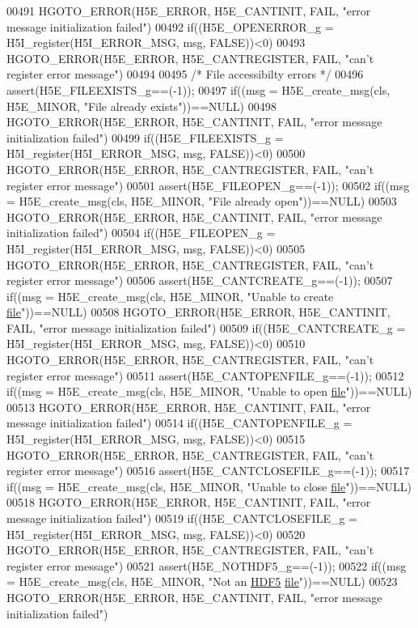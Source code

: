 \begin{DoxyCode}
00491     HGOTO\_ERROR(H5E\_ERROR, H5E\_CANTINIT, FAIL, "error message initialization failed")
00492 if((H5E\_OPENERROR\_g = H5I\_register(H5I\_ERROR\_MSG, msg, FALSE))<0)
00493     HGOTO\_ERROR(H5E\_ERROR, H5E\_CANTREGISTER, FAIL, "can't register error message")
00494 
00495 \textcolor{comment}{/* File accessibilty errors */}
00496 assert(H5E\_FILEEXISTS\_g==(-1));
00497 if((msg = H5E\_create\_msg(cls, H5E\_MINOR, "File already exists"))==NULL)
00498     HGOTO\_ERROR(H5E\_ERROR, H5E\_CANTINIT, FAIL, "error message initialization failed")
00499 if((H5E\_FILEEXISTS\_g = H5I\_register(H5I\_ERROR\_MSG, msg, FALSE))<0)
00500     HGOTO\_ERROR(H5E\_ERROR, H5E\_CANTREGISTER, FAIL, "can't register error message")
00501 assert(H5E\_FILEOPEN\_g==(-1));
00502 if((msg = H5E\_create\_msg(cls, H5E\_MINOR, "File already open"))==NULL)
00503     HGOTO\_ERROR(H5E\_ERROR, H5E\_CANTINIT, FAIL, "error message initialization failed")
00504 if((H5E\_FILEOPEN\_g = H5I\_register(H5I\_ERROR\_MSG, msg, FALSE))<0)
00505     HGOTO\_ERROR(H5E\_ERROR, H5E\_CANTREGISTER, FAIL, "can't register error message")
00506 assert(H5E\_CANTCREATE\_g==(-1));
00507 if((msg = H5E\_create\_msg(cls, H5E\_MINOR, "Unable to create \hyperlink{structfile}{file}"))==NULL)
00508     HGOTO\_ERROR(H5E\_ERROR, H5E\_CANTINIT, FAIL, "error message initialization failed")
00509 if((H5E\_CANTCREATE\_g = H5I\_register(H5I\_ERROR\_MSG, msg, FALSE))<0)
00510     HGOTO\_ERROR(H5E\_ERROR, H5E\_CANTREGISTER, FAIL, "can't register error message")
00511 assert(H5E\_CANTOPENFILE\_g==(-1));
00512 if((msg = H5E\_create\_msg(cls, H5E\_MINOR, "Unable to open \hyperlink{structfile}{file}"))==NULL)
00513     HGOTO\_ERROR(H5E\_ERROR, H5E\_CANTINIT, FAIL, "error message initialization failed")
00514 if((H5E\_CANTOPENFILE\_g = H5I\_register(H5I\_ERROR\_MSG, msg, FALSE))<0)
00515     HGOTO\_ERROR(H5E\_ERROR, H5E\_CANTREGISTER, FAIL, "can't register error message")
00516 assert(H5E\_CANTCLOSEFILE\_g==(-1));
00517 if((msg = H5E\_create\_msg(cls, H5E\_MINOR, "Unable to close \hyperlink{structfile}{file}"))==NULL)
00518     HGOTO\_ERROR(H5E\_ERROR, H5E\_CANTINIT, FAIL, "error message initialization failed")
00519 if((H5E\_CANTCLOSEFILE\_g = H5I\_register(H5I\_ERROR\_MSG, msg, FALSE))<0)
00520     HGOTO\_ERROR(H5E\_ERROR, H5E\_CANTREGISTER, FAIL, "can't register error message")
00521 assert(H5E\_NOTHDF5\_g==(-1));
00522 if((msg = H5E\_create\_msg(cls, H5E\_MINOR, "Not an \hyperlink{namespace_h_d_f5}{HDF5} \hyperlink{structfile}{file}"))==NULL)
00523     HGOTO\_ERROR(H5E\_ERROR, H5E\_CANTINIT, FAIL, "error message initialization failed")

\end{DoxyCode}
